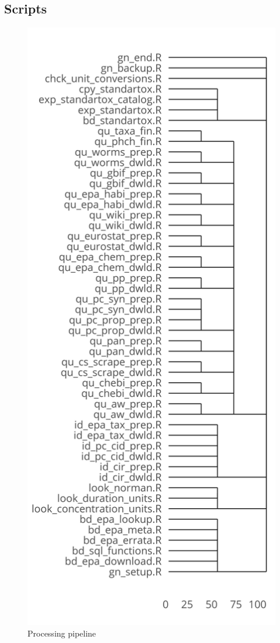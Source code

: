 %


\subsection*{Scripts}
\begin{figure}
    \includegraphics[width=0.5\linewidth]{article/figures/scripts_dendrogram.png}
    \caption{Processing pipeline}
    \label{fig:pipeline-tree}
\end{figure}



